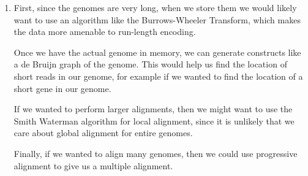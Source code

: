 \begin{enumerate}[label=(\alph*)]
  \item
    First, since the genomes are very long, when we store them we would likely want to use an algorithm like the Burrows-Wheeler Transform, which makes the data more amenable to run-length encoding. 

    Once we have the actual genome in memory, we can generate constructs like a de Bruijn graph of the genome. This would help us find the location of short reads in our genome, for example if we wanted to find the location of a short gene in our genome.

    If we wanted to perform larger alignments, then we might want to use the Smith Waterman algorithm for local alignment, since it is unlikely that we care about global alignment for entire genomes.

    Finally, if we wanted to align many genomes, then we could use progressive alignment to give us a multiple alignment.

        
\end{enumerate}

